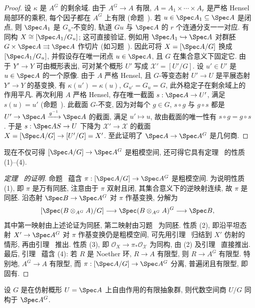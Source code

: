 \begin{proof}
设 $\kappa$ 是 $A^G$ 的剩余域. 由于 $A^G\to A$ 有限, $A=A_1\times\cdots\times A_r$ 是严格 Hensel 局部环的乘积, 每个因子都在 $A^G$ 上有限 (命题~). 若 $u\in\Spec A_1\subseteq\Spec A$ 是闭点, 则 $\Spec A_1$ 是 $G_u$-不变的, 轨道 $Gu$ 与 $\Spec A$ 的 $r$ 个连通分支一一对应. 有同构 $\mathcal X\cong[\Spec A_1/G_u]$; 这可直接验证, 例如用 $\Spec A_1\hookrightarrow\Spec A$ 对群胚 $G\times\Spec A\rightrightarrows\Spec A$ 作切片 (如习题~). 因此可将 $\mathcal X=[\Spec A/G]$ 换成 $[\Spec A_1/G_u]$, 并假设存在唯一闭点 $u\in\Spec A$, 且 $G$ 在集合意义下固定它. 由于 $Y'\to Y$ 可由概形表出, 可对某个概形 $U'$ 写成 $\mathcal X'=[U'/G]$. 设 $u'\in U'$ 是 $u\in\Spec A$ 的一个原像. 由于 $A$ 严格 Hensel, 且 $G$-等变态射 $U'\to U$ 是平展态射 $Y'\to Y$ 的基变换, 有 $\kappa(u')=\kappa(u)$, $G_{u'}=G_u=G$, 此外稳定子在剩余域上的作用平凡. 再次利用 $A$ 严格 Hensel, 存在唯一截面 $s:\Spec A\to U'$, 满足 $s(u)=u'$ (命题~). 此截面 $G$-不变, 因为对每个 $g\in G$, $s\circ g$ 与 $g\circ s$ 都是 $U'\to\Spec A\xrightarrow{g^{-1}}\Spec A$ 的截面, 满足 $u'\mapsto u$, 故由截面的唯一性有 $s\circ g=g\circ s$. 于是 $s:\Spec AS\to U$ 下降为 $\mathcal X'\to\mathcal X$ 的截面 $\mathcal X=[\Spec A/G]\to[U'/G]=\mathcal X'$. 至此证明了 $\Spec A\to\Spec A^G$ 是几何商.
\end{proof}
现在不仅可得 $[\Spec A/G]\to\Spec A^G$ 是粗模空间, 还可得它具有定理~ 的性质 (1)--(4).
\begin{proof}[定理~ 的证明]
命题~ 蕴含 $\pi:[\Spec A/G]\to\Spec A^G$ 是粗模空间. 为说明性质 (1), 即 $\pi$ 是万有同胚, 注意由于 $\pi$ 双射且闭, 其集合意义下的逆映射连续, 故 $\pi$ 是同胚. 沿态射 $\Spec B\to\Spec A^G$ 对 $\pi$ 作基变换, 分解为
\[
{[\Spec(B\otimes_{A^G}A)/G]}\longrightarrow\Spec(B\otimes_{A^G}A)^G\longrightarrow\Spec B,
\]
其中第一映射由上述论证为同胚, 第二映射由习题~ 为同胚. 性质 (2), 即沿平坦态射 $X'\to\Spec A^G$ 对 $\pi$ 作基变换仍是粗模空间, 可先用引理~ 归结到 $X'$ 仿射的情形, 再由引理~ 推出. 性质 (3), 即 $\mathcal O_X\to\pi_*\mathcal O_{\mathcal X}$ 为同构, 由 (2) 及引理~ 直接推出. 最后, 引理~ 蕴含 (4): 若 $R$ 是 Noether 环, $R\to A$ 有限型, 则 $R\to A^G$ 有限型. 特别地, $A^G\to A$ 有限型, 而 $\pi:[\Spec A/G]\to\Spec A^G$ 分离, 普遍闭且有限型, 即固有.
\end{proof}
\begin{corollary}\label{src:5.2.13}
设 $G$ 是在仿射概形 $U=\Spec A$ 上自由作用的有限抽象群, 则代数空间商 $U/G$ 同构于 $\Spec A^G$.
\end{corollary}
